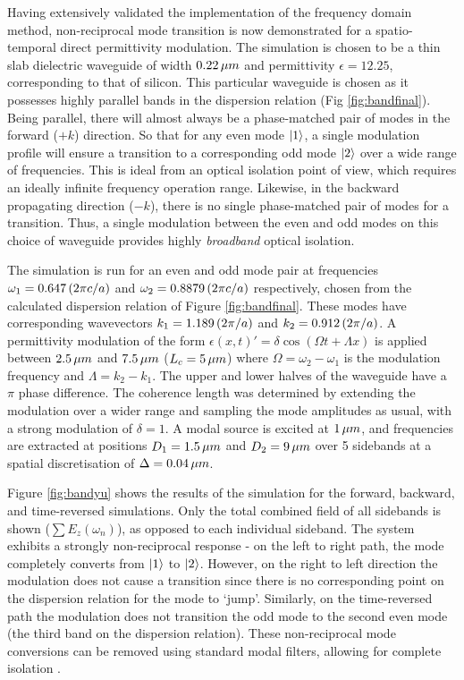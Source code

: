 Having extensively validated the implementation of the frequency domain method, non-reciprocal mode transition is now demonstrated for a spatio-temporal direct permittivity modulation. The simulation is chosen to be a thin slab dielectric waveguide of width $0.22  \mskip3mu \mu m$ and permittivity $\epsilon = 12.25$, corresponding to that of silicon. This particular waveguide is chosen as it possesses highly parallel bands in the dispersion relation (Fig \ref{fig:bandfinal}). Being parallel, there will almost always be a phase-matched pair of modes in the forward ($+k$) direction. So that for any even mode $\ket{1}$, a single modulation profile will ensure a transition to a corresponding odd mode $\ket{2}$ over a wide range of frequencies. This is ideal from an optical isolation point of view, which requires an ideally infinite frequency operation range. Likewise, in the backward propagating direction ($-k$), there is no single phase-matched pair of modes for a transition. Thus, a single modulation between the even and odd modes on this choice of waveguide provides highly \textit{broadband} optical isolation.

The simulation is run for an even and odd mode pair at frequencies $\omega_1 = 0.647 \mskip3mu  (2 \pi c/a)$ and $\omega_2 = 0.8879 \mskip3mu  (2\pi c/a)$ respectively, chosen from the calculated dispersion relation of Figure \ref{fig:bandfinal}. These modes have corresponding wavevectors $k_1 = 1.189 \mskip3mu  (2 \pi /a)$ and $k_2 = 0.912  \mskip3mu (2 \pi/a)$. A permittivity modulation of the form $\epsilon(x,t)' = \delta \cos (\Omega t + \Lambda x)$ is applied between $2.5  \mskip3mu \mu m$ and $7.5  \mskip3mu \mu m$ ($L_c = 5  \mskip3mu \mu m$) where $\Omega = \omega_2-\omega_1$ is the modulation frequency and $\Lambda = k_2 - k_1$. The upper and lower halves of the waveguide have a $\pi$ phase difference. The coherence length was determined by extending the modulation over a wider range and sampling the mode amplitudes as usual, with a strong modulation of $\delta = 1$. A modal source is excited at $1  \mskip3mu \mu m$, and frequencies are extracted at positions $D_1 = 1.5 \mskip3mu  \mu m$ and $D_2 = 9 \mskip3mu  \mu m$ over 5 sidebands at a spatial discretisation of $\Delta = 0.04  \mskip3mu \mu m$.

%
Figure \ref{fig:bandyu} shows the results of the simulation for the forward, backward, and time-reversed simulations. Only the total combined field of all sidebands is shown ($\sum E_z(\omega_n)$), as opposed to each individual sideband. The system exhibits a strongly non-reciprocal response - on the left to right path, the mode completely converts from $\ket{1}$ to $\ket{2}$. However, on the right to left direction the modulation does not cause a transition since there is no corresponding point on the dispersion relation for the mode to `jump'. Similarly, on the time-reversed path the modulation does not transition the odd mode to the second even mode (the third band on the dispersion relation). These non-reciprocal mode conversions can be removed using standard modal filters, allowing for complete isolation \cite{Lee2003,Jiao2005}.

